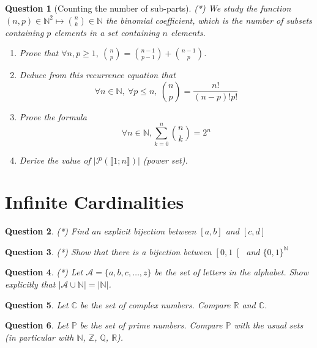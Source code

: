 \documentclass[]{article}
\newtheorem{question}{Question}
\newcommand{\primes}{\mathbb{P}}
\newcommand{\N}{\mathbb{N}}
\newcommand{\Z}{\mathbb{Z}}
\newcommand{\Q}{\mathbb{Q}}
\newcommand{\R}{\mathbb{R}}
\newcommand{\C}{\mathbb{C}}
\newcommand{\card}[1]{| #1 |}
\begin{document}
\begin{question}[Counting the number of sub-parts]
	(*) We study the function $(n,p)\in \N^2\mapsto \binom{n}{k}\in \N$ the binomial coefficient, which is the number of subsets containing $p$ elements in a set containing $n$ elements.
	\begin{enumerate}[label=\alph*.]
		\item Prove that $\forall n,p\geq 1,~\displaystyle \binom{n}{p} = \binom{n-1}{p-1}+\binom{n-1}{p}$.
		\item Deduce from this recurrence equation that
		\begin{equation*}
			\forall n\in \N,~\forall p\leq n,~\binom{n}{p} = \frac{n!}{(n-p)!p!}
		\end{equation*}
		\item Prove the formula
		\begin{equation*}
			\forall n\in \N, \sum_{k=0}^n \binom{n}{k} = 2^n
		\end{equation*}
		\item Derive the value of $\card{\mathcal{P}(\llbracket 1;n\rrbracket)}$ (power set).
	\end{enumerate}
\end{question}

\section{Infinite Cardinalities}
\begin{question}
	(*) Find an explicit bijection between $\left[ a,b \right]$ and $\left[ c,d \right]$
\end{question}
\begin{question}
	(*) Show that there is a bijection between $\left[ 0,1 \right[$ and $\{0,1\}^\N$
\end{question}
\begin{question}
	(*) Let $\mathcal{A} = \{a,b,c,\dots,z\}$ be the set of letters in the alphabet.
	Show explicitly that $\card{\mathcal{A} \cup \N}=\card{\N}$.
\end{question}
\begin{question}
	Let $\C$ be the set of complex numbers. Compare $\R$ and $\C$.
\end{question}
\begin{question}
	Let $\primes$ be the set of prime numbers. Compare $\primes$ with the usual sets (in particular with $\N$, $\Z$, $\Q$, $\R$).
\end{question}
\end{document}
